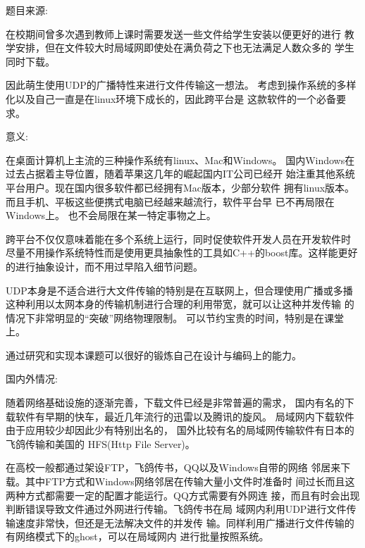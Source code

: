 \documentclass{data/hbue}
\begin{document}


%
\reportabstract
{
\begin{description}
	\item{题目来源:} 

		在校期间曾多次遇到教师上课时需要发送一些文件给学生安装以便更好的进行
		教学安排，但在文件较大时局域网即使处在满负荷之下也无法满足人数众多的
		学生同时下载。

		因此萌生使用UDP的广播特性来进行文件传输这一想法。
		考虑到操作系统的多样化以及自己一直是在linux环境下成长的，因此跨平台是
		这款软件的一个必备要求。

	\item{意义:}

		在桌面计算机上主流的三种操作系统有linux、Mac和Windows。
		国内Windows在过去占据着主导位置，随着苹果这几年的崛起国内IT公司已经开
		始注重其他系统平台用户。现在国内很多软件都已经拥有Mac版本，少部分软件
		拥有linux版本。而且手机、平板这些便携式电脑已经越来越流行，软件平台早
		已不再局限在Windows上。 也不会局限在某一特定事物之上。

		跨平台不仅仅意味着能在多个系统上运行，同时促使软件开发人员在开发软件时
		尽量不用操作系统特性而是使用更具抽象性的工具如C++的boost库。这样能更好
		的进行抽象设计，而不用过早陷入细节问题。

		UDP本身是不适合进行大文件传输的特别是在互联网上，但合理使用广播或多播
		这种利用以太网本身的传输机制进行合理的利用带宽，就可以让这种并发传输
		的情况下非常明显的``突破''网络物理限制。
		可以节约宝贵的时间，特别是在课堂上。

		通过研究和实现本课题可以很好的锻炼自己在设计与编码上的能力。

\end{description}
}

\reportdescription
{
\begin{description}
	\item{国内外情况:}

		随着网络基础设施的逐渐完善，下载文件已经是非常普遍的需求，
		国内有名的下载软件有早期的快车，最近几年流行的迅雷以及腾讯的旋风。
		局域网内下载软件由于应用较少却因此少有特别出名的，
		国外比较有名的局域网传输软件有日本的飞鸽传输和美国的
		HFS(Http File Server)。

		在高校一般都通过架设FTP，飞鸽传书，QQ以及Windows自带的网络
		邻居来下载。其中FTP方式和Windows网络邻居在传输大量小文件时准备时
		间过长而且这两种方式都需要一定的配置才能运行。QQ方式需要有外网连
		接，而且有时会出现判断错误导致文件通过外网进行传输。飞鸽传书在局
		域网内利用UDP进行文件传输速度非常快，但还是无法解决文件的并发传
		输。同样利用广播进行文件传输的有网络模式下的ghost，可以在局域网内
		进行批量按照系统。
\end{description}
}
\end{document}
